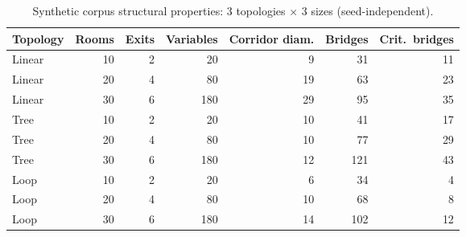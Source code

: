 \documentclass[11pt]{article}
\begin{document}
\begin{table}[h]
\centering
\caption{Synthetic corpus structural properties: 3 topologies $\times$ 3 sizes (seed-independent).}
\label{tab:appendixb}
\small
\begin{tabular}{lrrrrrr}
\toprule
Topology & Rooms & Exits & Variables & Corridor diam. & Bridges & Crit.\ bridges \\
\midrule
Linear & 10 & 2 & 20 & 9 & 31 & 11 \\
Linear & 20 & 4 & 80 & 19 & 63 & 23 \\
Linear & 30 & 6 & 180 & 29 & 95 & 35 \\
Tree & 10 & 2 & 20 & 10 & 41 & 17 \\
Tree & 20 & 4 & 80 & 10 & 77 & 29 \\
Tree & 30 & 6 & 180 & 12 & 121 & 43 \\
Loop & 10 & 2 & 20 & 6 & 34 & 4 \\
Loop & 20 & 4 & 80 & 10 & 68 & 8 \\
Loop & 30 & 6 & 180 & 14 & 102 & 12 \\
\bottomrule
\end{tabular}
\end{table}
\end{document}
